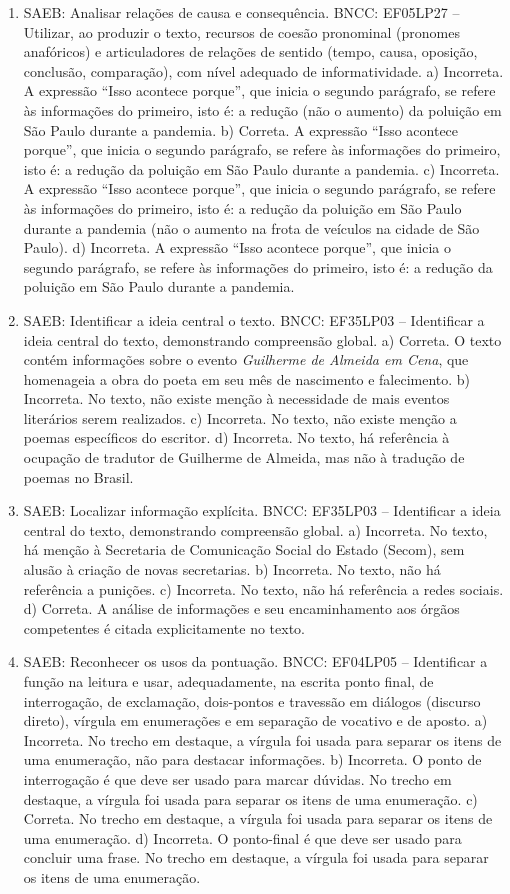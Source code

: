 \begin{enumerate}
\item
SAEB: Analisar relações de causa e consequência. BNCC: EF05LP27 -- Utilizar, ao produzir o texto, recursos de coesão pronominal (pronomes anafóricos) e articuladores de relações de sentido (tempo, causa, oposição, conclusão, comparação), com nível adequado de informatividade. a) Incorreta. A expressão ``Isso acontece porque'', que inicia o segundo parágrafo, se refere às informações do primeiro, isto é: a redução (não o aumento) da poluição em São Paulo durante a pandemia. b) Correta. A expressão ``Isso acontece porque'', que inicia o segundo parágrafo, se refere às informações do primeiro, isto é: a redução da poluição em São Paulo durante a pandemia. c) Incorreta. A expressão ``Isso acontece porque'', que inicia o segundo parágrafo, se refere às informações do primeiro, isto é: a redução da poluição em São Paulo durante a pandemia (não o aumento na frota de veículos na cidade de São Paulo). d) Incorreta. A expressão ``Isso acontece porque'', que inicia o segundo parágrafo, se refere às informações do primeiro, isto é: a redução da poluição em São Paulo durante a pandemia.

\item
SAEB: Identificar a ideia central o texto. BNCC: EF35LP03 -- Identificar a ideia central do texto, demonstrando compreensão global. a) Correta. O texto contém informações sobre o evento \textit{Guilherme de Almeida em Cena}, que homenageia a obra do poeta em seu mês de nascimento e falecimento. b) Incorreta. No texto, não existe menção à necessidade de mais eventos literários serem realizados. c) Incorreta. No texto, não existe menção a poemas específicos do escritor. d) Incorreta. No texto, há referência à ocupação de tradutor de Guilherme de Almeida, mas não à tradução de poemas no Brasil.

\item
SAEB: Localizar informação explícita. BNCC: EF35LP03 -- Identificar a ideia central do texto, demonstrando compreensão global. a) Incorreta. No texto, há menção à Secretaria de Comunicação Social do Estado (Secom), sem alusão à criação de novas secretarias. b) Incorreta. No texto, não há referência a punições. c) Incorreta. No texto, não há referência a redes sociais. d) Correta. A análise de informações e seu encaminhamento aos órgãos competentes é citada explicitamente no texto.

\item
SAEB: Reconhecer os usos da pontuação. BNCC: EF04LP05 -- Identificar a função na leitura e usar, adequadamente, na escrita ponto final, de interrogação, de exclamação, dois-pontos e travessão em diálogos (discurso direto), vírgula em enumerações e em separação de vocativo e de aposto. a) Incorreta. No trecho em destaque, a vírgula foi usada para separar os itens de uma enumeração, não para destacar informações. b) Incorreta. O ponto de interrogação é que deve ser usado para marcar dúvidas. No trecho em destaque, a vírgula foi usada para separar os itens de uma enumeração. c) Correta. No trecho em destaque, a vírgula foi usada para separar os itens de uma enumeração. d) Incorreta. O ponto-final é que deve ser usado para concluir uma frase. No trecho em destaque, a vírgula foi usada para separar os itens de uma enumeração.


\end{enumerate}
